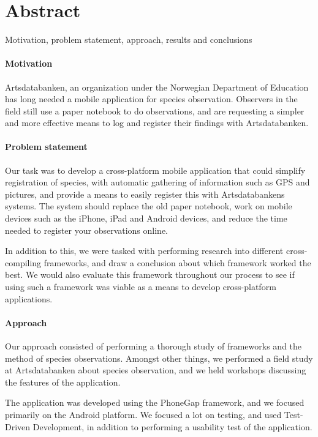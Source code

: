 \section{Abstract}

Motivation, problem statement, approach, results and conclusions

\paragraph{Motivation}
Artsdatabanken, an organization under the Norwegian Department of Education has
long needed a mobile application for species observation. Observers in the field
still use a paper notebook to do observations, and are requesting a simpler and
more effective means to log and register their findings with Artsdatabanken.

\paragraph{Problem statement}
Our task was to develop a cross-platform mobile application that could simplify
registration of species, with automatic gathering of information such as GPS and
pictures, and provide a means to easily register this with Artsdatabankens
systems. The system should replace the old paper notebook, work on mobile
devices such as the iPhone, iPad and Android devices, and reduce the time needed
to register your observations online.

In addition to this, we were tasked with performing research into different
cross-compiling frameworks, and draw a conclusion about which framework worked
the best. We would also evaluate this framework throughout our process to see if
using such a framework was viable as a means to develop cross-platform
applications.

\paragraph{Approach}
Our approach consisted of performing a thorough study of frameworks and the
method of species observations. Amongst other things, we performed a field study
at Artsdatabanken about species observation, and we held workshops discussing
the features of the application. 

The application was developed using the PhoneGap framework, and we focused
primarily on the Android platform. We focused a lot on testing, and used
Test-Driven Development, in addition to performing a usability test of the
application.

